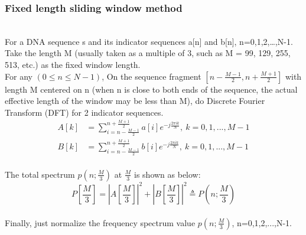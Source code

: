 \documentclass[conference]{IEEEtran}
\begin{document}
\subsubsection{Fixed length sliding window method}
~\\\indent For a DNA sequence s and its indicator sequences a[n] and b[n], n=0,1,2,\ldots,N-1. Take the length M (usually taken as a multiple of 3, such as M = 99, 129, 255, 513, etc.) as the fixed window length.
~\\ \indent For any $(0\le n \le N-1)$, On the sequence fragment $[n-\frac{M-1}{2}, n + \frac{M+1}{2}]$ with length M centered on n (when n is close to both ends of the sequence, the actual effective length of the window may be less than M), do Discrete Fourier Transform (DFT) for 2 indicator sequences.
\begin{equation}\label{DFT-sequence1}
    \begin{aligned} 
    A[k]&=\sum_{i=n-\frac{M-1}{2}}^{n+\frac{M+1}{2}}{a[i]e^{-j\frac{2\pi ik}{N}}},\ k=0,1,...,M-1\\
    B[k]&=\sum_{i=n-\frac{M-1}{2}}^{n+\frac{M+1}{2}}{b[i]e^{-j\frac{2\pi ik}{N}}},\ k=0,1,...,M-1
\end{aligned}
\end{equation} 
~\\ \indent The total spectrum $p(n;\frac{M}{3})$ at $\frac{M}{3}$ is shown as below:
\begin{equation}\label{total-sp}
    P[\frac{M}{3}]=|A[\frac{M}{3}]|^2+|B[\frac{M}{3}]|^2\triangleq P(n;\frac{M}{3})
\end{equation}
~\\ \indent Finally, just normalize the frequency spectrum value $p(n;\frac{M}{3})$, n=0,1,2,...,N-1.

~\\
\end{document}
